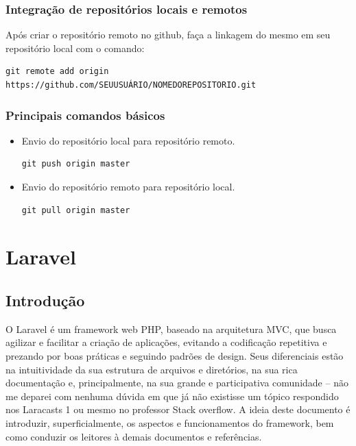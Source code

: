 \documentclass[
12pt,				%
openany,			%
twoside,			%
a4paper,			%
english,			%
french,				%
spanish,			%
brazil,				%
]{abntex2}
\begin{document}
\subsection{Integração de repositórios locais e remotos}
Após criar o repositório remoto no github, faça a linkagem do mesmo em seu repositório local com o comando:

        \begin{lstlisting}[style=bash]
            git remote add origin https://github.com/SEUUSUÁRIO/NOMEDOREPOSITORIO.git
        \end{lstlisting}

\subsection{Principais comandos básicos}


\begin{itemize}
    \item Envio do repositório local para repositório remoto. 
        \begin{lstlisting}[style=bash]
            git push origin master
        \end{lstlisting}
        
    \item Envio do repositório remoto para repositório local. 
        \begin{lstlisting}[style=bash]
            git pull origin master
        \end{lstlisting}
\end{itemize}

\chapter{Laravel}
\section{Introdução}
O Laravel é um framework web PHP, baseado na arquitetura MVC, que busca agilizar e
facilitar a criação de aplicações, evitando a codificação repetitiva e prezando por boas práticas
e seguindo padrões de design. Seus diferenciais estão na intuitividade da sua estrutura de
arquivos e diretórios, na sua rica documentação e, principalmente, na sua grande e
participativa comunidade – não me deparei com nenhuma dúvida em que já não existisse um
tópico respondido nos Laracasts 1 ou mesmo no professor Stack overflow.
A ideia deste documento é introduzir, superficialmente, os aspectos e funcionamentos do
framework, bem como conduzir os leitores à demais documentos e referências.
\end{document}
